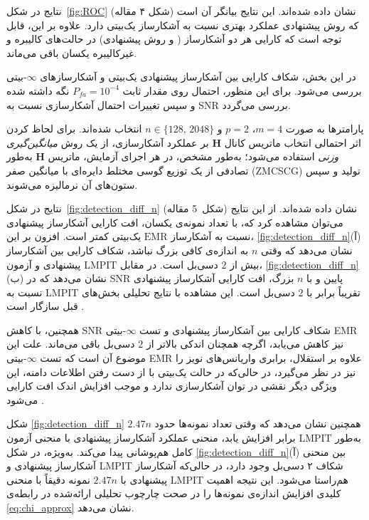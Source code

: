 نتایج در شکل~\ref{fig:ROC} (شکل ۴ مقاله) نشان داده شده‌اند.  
این نتایج بیانگر آن است که روش پیشنهادی عملکرد بهتری نسبت به آشکارساز  یک‌بیتی دارد.  
علاوه بر این، قابل توجه است که کارایی هر دو آشکارساز ( و روش پیشنهادی) 
در حالت‌های کالیبره و غیرکالیبره یکسان باقی می‌ماند.  




در این بخش، شکاف کارایی بین آشکارساز پیشنهادی یک‌بیتی و آشکارسازهای $\infty$-بیتی بررسی می‌شود.  
برای این منظور، احتمال  روی مقدار ثابت $P_{fa}=10^{-4}$ نگه داشته شده و سپس تغییرات احتمال آشکارسازی نسبت به SNR بررسی می‌گردد.  

پارامترها به صورت $m=4$، $p=2$ و $n\in\{128,\,2048\}$ انتخاب شده‌اند.  
برای لحاظ کردن اثر احتمالی انتخاب ماتریس کانال $\mathbf{H}$ بر عملکرد آشکارسازی، از یک روش \emph{میانگین‌گیری وزنی} استفاده می‌شود؛  
به‌طور مشخص، در هر اجرای آزمایش، ماتریس $\mathbf{H}$ به‌طور تصادفی از یک توزیع گوسی مختلط دایره‌ای با میانگین صفر (ZMCSCG) تولید و سپس ستون‌های آن نرمالیزه می‌شوند.  

نتایج در شکل~\ref{fig:detection_diff_n} (شکل~5 مقاله) نشان داده شده‌اند.  
از این نتایج می‌توان مشاهده کرد که، با تعداد نمونه‌ی یکسان، افت کارایی آشکارساز پیشنهادی نسبت به آشکارساز $\mathrm{EMR}$ یک‌بیتی کمتر است.  
افزون بر این، \ref{fig:detection_diff_n}(آ) نشان می‌دهد که وقتی $n$ به اندازه‌ی کافی بزرگ نباشد، شکاف کارایی بین آشکارساز پیشنهادی و آزمون LMPIT بیش از $2$ دسی‌بل است.  
در مقابل، \ref{fig:detection_diff_n}(ب) نشان می‌دهد که در SNR پایین و با $n$ بزرگ، افت کارایی آشکارساز پیشنهادی نسبت به LMPIT تقریباً برابر با $2$ دسی‌بل است.  
این مشاهده با نتایج تحلیلی بخش‌های قبل سازگار است .  

همچنین، با کاهش SNR شکاف کارایی بین آشکارساز پیشنهادی و تست $\infty$-بیتی EMR نیز کاهش می‌یابد، اگرچه همچنان اندکی بالاتر از $2$ دسی‌بل باقی می‌ماند.  
علت این موضوع آن است که تست $\infty$-بیتی EMR علاوه بر استقلال، برابری واریانس‌های نویز را نیز در نظر می‌گیرد، در حالی‌که در حالت یک‌بیتی با از دست رفتن اطلاعات دامنه، این ویژگی دیگر نقشی در توان آشکارسازی ندارد و موجب افزایش اندک افت کارایی می‌شود .  

شکل \ref{fig:detection_diff_n} همچنین نشان می‌دهد که وقتی تعداد نمونه‌ها حدود $2.47n$ برابر افزایش یابد، منحنی عملکرد آشکارساز پیشنهادی با منحنی آزمون LMPIT به‌طور کامل هم‌پوشانی پیدا می‌کند.  
به‌ویژه، در شکل \ref{fig:detection_diff_n}(آ) بین منحنی آشکارساز پیشنهادی و LMPIT شکاف ۲ دسی‌بل وجود دارد، در حالی‌که آشکارساز پیشنهادی با $2.47n$ نمونه دقیقاً با منحنی LMPIT هم‌راستا می‌شود.  
این نتیجه اهمیت کلیدی افزایش اندازه‌ی نمونه‌ها را در صحت چارچوب تحلیلی ارائه‌شده در رابطه‌ی \eqref{eq:chi_approx} نشان می‌دهد.

